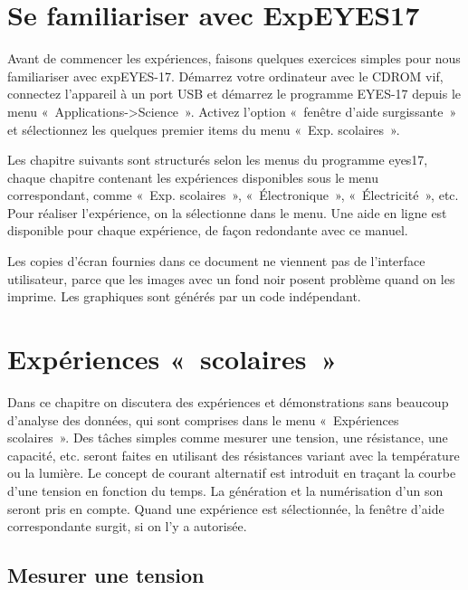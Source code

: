 \documentclass[a4paper,12pt,french]{sphinxmanual}
\begin{document}
\chapter{Se familiariser avec ExpEYES17}
\label{\detokenize{1.5:se-familiariser-avec-expeyes17}}\label{\detokenize{1.5::doc}}
Avant de commencer les expériences, faisons quelques exercices simples
pour nous familiariser avec expEYES-17. Démarrez votre ordinateur
avec le CDROM vif, connectez l’appareil à un port USB et démarrez
le programme EYES-17 depuis le menu « Applications-\textgreater{}Science ».
Activez l’option « fenêtre d’aide surgissante » et sélectionnez
les quelques premier items du menu « Exp. scolaires ».

Les chapitre suivants sont structurés selon les menus du programme
eyes17, chaque chapitre contenant les expériences disponibles sous
le menu correspondant, comme « Exp. scolaires », « Électronique »,
« Électricité », etc. Pour réaliser l’expérience, on la sélectionne
dans le menu. Une aide en ligne est disponible pour chaque expérience,
de façon redondante avec ce manuel.

Les copies d’écran fournies dans ce document ne viennent pas de l’interface
utilisateur, parce que les images avec un fond noir posent problème
quand on les imprime. Les graphiques sont générés par un code indépendant.


\chapter{Expériences « scolaires »}
\label{\detokenize{index:experiences-scolaires}}
Dans ce chapitre on discutera des expériences et démonstrations sans
beaucoup d’analyse des données, qui sont comprises dans le menu
« Expériences scolaires ». Des tâches simples comme mesurer une
tension, une résistance, une capacité, etc. seront faites en utilisant
des résistances variant avec la température ou la lumière. Le concept
de courant alternatif est introduit en traçant la courbe d’une tension
en fonction du temps. La génération et la numérisation d’un son seront
pris en compte. Quand une expérience est sélectionnée, la fenêtre
d’aide correspondante surgit, si on l’y a autorisée.


\section{Mesurer une tension}
\label{\detokenize{2.1:mesurer-une-tension}}\label{\detokenize{2.1::doc}}
\end{document}
